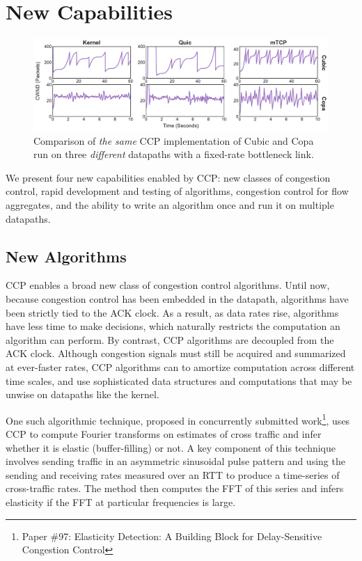\section{New Capabilities}
\label{s:capabilities}
 \begin{figure}[t!]
 \centering
     \includegraphics[width=2\columnwidth]{img/datapath-compare.pdf}
     \caption{Comparison of \textit{the same} CCP implementation of Cubic and Copa run on three \textit{different} datapaths with a fixed-rate bottleneck link. %
     }\label{fig:datapaths:wora}
 \end{figure}


We present four new capabilities enabled by CCP: new classes of congestion control, rapid development and testing of algorithms, congestion control for flow aggregates, and the ability to write an algorithm once and run it on multiple datapaths.

\subsection{New Algorithms}
\label{s:capabilities:algs}

CCP enables a broad new class of congestion control algorithms.
Until now, because congestion control has been embedded in the datapath,
algorithms have been strictly tied to the ACK clock.
As a result, as data rates rise, algorithms have less time to make decisions,
which naturally restricts the computation an algorithm can perform.
By contrast, CCP algorithms are decoupled from the ACK clock.
Although congestion signals must still be acquired and summarized at ever-faster rates, CCP algorithms can to amortize computation across different time scales, and use sophisticated data structures and computations that may be unwise on datapaths like the kernel.

One such algorithmic technique, proposed in concurrently submitted work\footnote{Paper \#97: Elasticity Detection: A Building Block for Delay-Sensitive Congestion Control}, uses CCP to compute Fourier transforms on estimates of cross traffic and infer whether it is elastic (buffer-filling) or not.
A key component of this technique involves sending traffic in an asymmetric sinusoidal pulse pattern and using the sending and receiving rates measured over an RTT to produce a time-series of cross-traffic rates. The method then computes the FFT of this series and infers elasticity if the FFT at particular frequencies is large.

